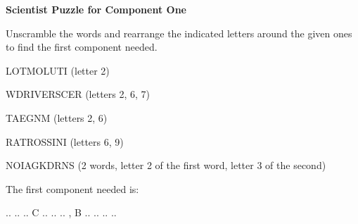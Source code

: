 \documentclass[white]{guildcamp3}
\begin{document}
\name{\wSciPuzzleOne{}} %

\large\textbf{Scientist Puzzle for Component One}

Unscramble the words and rearrange the indicated letters around the given ones to find the first component needed.   

LOTMOLUTI (letter 2)

WDRIVERSCER (letters 2, 6, 7)

TAEGNM (letters 2, 6)

RATROSSINI (letters 6, 9)

NOIAGKDRNS (2 words, letter 2 of the first word, letter 3 of the second)

The first component needed is: 

.. .. .. C .. .. .. , B .. .. .. ..


\end{document}
